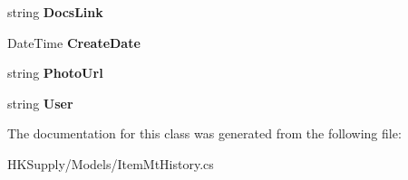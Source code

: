\begin{DoxyCompactItemize}
\item 
\mbox{\label{class_h_k_supply_1_1_models_1_1_item_mt_history_ad991f00b0a46687f7ee4a96df1b8e984}} 
string {\bfseries Docs\+Link}
\item 
\mbox{\label{class_h_k_supply_1_1_models_1_1_item_mt_history_a474f63fbd1d010901ca24cea623544e0}} 
Date\+Time {\bfseries Create\+Date}
\item 
\mbox{\label{class_h_k_supply_1_1_models_1_1_item_mt_history_ad288e0a21a31b0041e49491c0be55230}} 
string {\bfseries Photo\+Url}
\item 
\mbox{\label{class_h_k_supply_1_1_models_1_1_item_mt_history_a6e45f9da8191cc76e87b09849554321f}} 
string {\bfseries User}
\end{DoxyCompactItemize}


The documentation for this class was generated from the following file\+:\begin{DoxyCompactItemize}
\item 
H\+K\+Supply/\+Models/Item\+Mt\+History.\+cs\end{DoxyCompactItemize}
